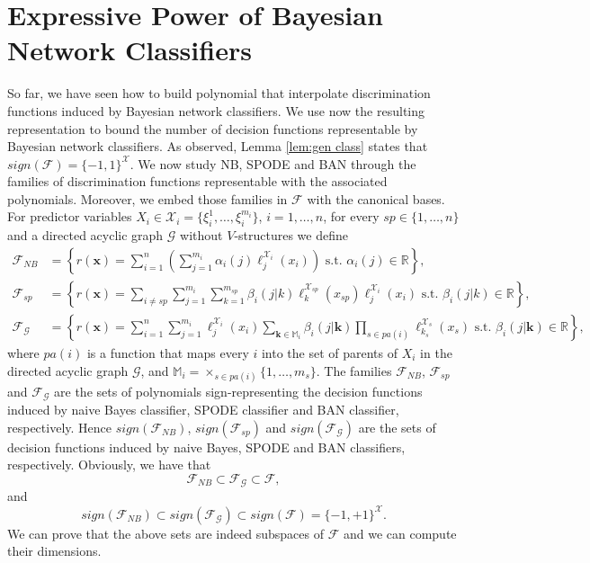 \documentclass[11pt,a4paper, twoside]{book}
\newcommand{\bchi}{\boldsymbol{\mathcal{X}}}
\newcommand{\nchi}{\mathcal{X}}
\begin{document}
\section{Expressive Power of Bayesian Network Classifiers}
\label{sec:expressive}
So far, we have seen how to build polynomial that interpolate discrimination functions induced by Bayesian network classifiers.
We use now the resulting representation to bound the number of decision functions representable by Bayesian network classifiers.
As observed, {Lemma \ref{lem:gen class}} states that $sign(\mathcal{F})=\{-1,1\}^{\bchi}$.
We now study NB, SPODE and BAN through the families of discrimination functions representable with the associated polynomials. Moreover, we embed those families in $\mathcal{F}$ with the canonical bases.
For predictor variables $X_i	\in \nchi_i=\{\xi_i^1,\ldots,\xi_i^{m_i}\}$, $i=1,\ldots,n$, for every $sp\in\{1,\ldots,n\}$ and a directed acyclic graph $\mathcal{G}$ without $V$-structures we define
\begin{align}
\label{eq:defspace1} 
\mathcal{F}_{NB}&=\left\{ r(\mathbf{x})=\sum_{i=1}^n \left( \sum_{j=1}^{m_i}  \alpha_{i}(j)\ell ^{\nchi_i} _j(x_i) \right)\text{ s.t. } \alpha_{i}(j) \in \mathbb{R}  \right\} , \\
\label{eq:defspace2} 
\mathcal{F}_{sp}&=\left\{ r(\mathbf{x})= \sum_{i\neq sp} \sum_{j=1}^{m_i}\sum_{k=1}^{m_{sp}} \beta_{i}(j|k) \ell_k^{\nchi_{sp}}(x_{sp})\ell_j^{\nchi_i}(x_i) \text{ s.t. } \beta_{i}(j|k) \in \mathbb{R} \right\} ,\\
\label{eq:defspace3} 
 \mathcal{F}_{\mathcal{G}}&=\left\{ r(\mathbf{x})=\sum_{i=1}^{n} \sum_{j=1}^{m_i}\ell_{j}^{\nchi_i}(x_i) \sum_{\mathbf{k}\in \mathbb{M}_i } \beta_{i}(j|\mathbf{k})\prod_{s\in  {pa}(i)} \ell_{k_s}^{\nchi_{s}}(x_{s}) \text{ s.t. } \beta_{i}(j|\mathbf{k})\in\mathbb{R} \right\} ,\end{align}
where $ {pa}(i)$ is a function that maps every $i$ into the set of parents of $X_i$ in the directed acyclic graph $\mathcal{G}$, and $\mathbb{M}_i=\times_{s\in {pa}(i)}\{1,\ldots,m_s\}$.
The families $ \mathcal{F}_{NB}$, $\mathcal{F}_{sp}$ and $\mathcal{F}_{\mathcal{G}}$ are the sets of polynomials sign-representing the decision functions induced by naive Bayes classifier, SPODE classifier and BAN classifier, respectively. Hence $sign(\mathcal{F}_{NB})$, $sign(\mathcal{F}_{sp})$ and $sign(\mathcal{F}_{\mathcal{G}})$ are the sets of decision functions induced by naive Bayes, SPODE and BAN classifiers, respectively.
Obviously, we have that $$\mathcal{F}_{NB}\subset\mathcal{F}_{\mathcal{G}}\subset\mathcal{F},$$
and
\[sign(\mathcal{F}_{NB})\subset sign(\mathcal{F}_{\mathcal{G}})\subset  sign(\mathcal{F})=\{-1,+1\}^{\bchi}.\] 
We can prove that the above sets are indeed subspaces of $\mathcal{F}$ and we can compute  their dimensions.
\end{document}
